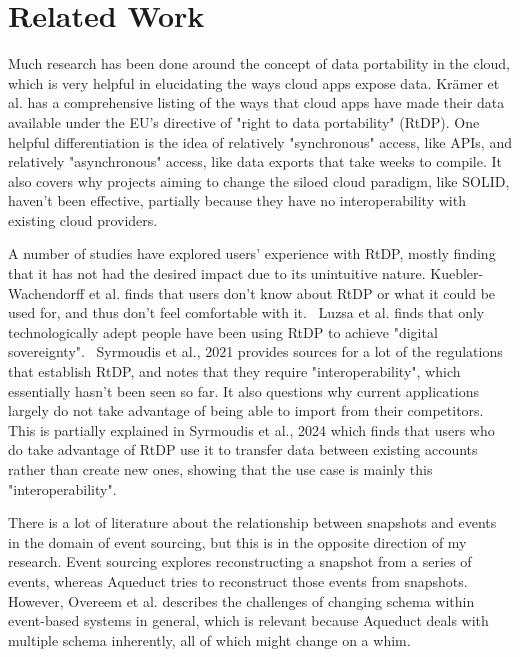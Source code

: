\documentclass[manuscript,review,anonymous]{acmart}
\begin{document}
\section{Related Work}
Much research has been done around the concept of data portability in the cloud, which is very helpful in elucidating the ways cloud apps expose data. Krämer et al. has a comprehensive listing of the ways that cloud apps have made their data available under the EU's directive of "right to data portability" (RtDP). One helpful differentiation is the idea of relatively "synchronous" access, like APIs, and relatively "asynchronous" access, like data exports that take weeks to compile. It also covers why projects aiming to change the siloed cloud paradigm, like SOLID, haven't been effective, partially because they have no interoperability with existing cloud providers.~\cite{kramerMakingDataPortability}

A number of studies have explored users' experience with RtDP, mostly finding that it has not had the desired impact due to its unintuitive nature. Kuebler-Wachendorff et al. finds that users don't know about RtDP or what it could be used for, and thus don't feel comfortable with it.~\cite{kuebler-wachendorffRightDataPortability2021} Luzsa et al. finds that only technologically adept people have been using RtDP to achieve "digital sovereignty".~\cite{luzsaOnlineServiceSwitching2022} Syrmoudis et al., 2021 provides sources for a lot of the regulations that establish RtDP, and notes that they require "interoperability", which essentially hasn't been seen so far. It also questions why current applications largely do not take advantage of being able to import from their competitors.~\cite{syrmoudisDataPortabilityOnline2021} This is partially explained in Syrmoudis et al., 2024 which finds that users who do take advantage of RtDP use it to transfer data between existing accounts rather than create new ones, showing that the use case is mainly this "interoperability".~\cite{syrmoudisUnlockingPersonalData2024}

There is a lot of literature about the relationship between snapshots and events in the domain of event sourcing, but this is in the opposite direction of my research. Event sourcing explores reconstructing a snapshot from a series of events, whereas Aqueduct tries to reconstruct those events from snapshots. However, Overeem et al. describes the challenges of changing schema within event-based systems in general, which is relevant because Aqueduct deals with multiple schema inherently, all of which might change on a whim.~\cite{overeemDarkSideEvent2017}
\end{document}
